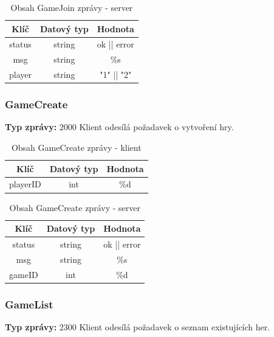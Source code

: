 \documentclass[12pt, a4paper]{article}
\begin{document}
    \begin{table}[H]
        \centering
        \begin{tabular}{|c|c|c|}
            \hline
            Klíč & Datový typ & Hodnota \\
            \hline
            \hline
            status & string & ok || error \\
            \hline
            msg & string & \%s \\
            \hline
            player & string & "1" || "2" \\
            \hline
        \end{tabular}
        \caption{Obsah GameJoin zprávy - server}
    \end{table}

\subsubsection{GameCreate}
\textbf{Typ zprávy: } 2000 \newline
Klient odesílá požadavek o vytvoření hry. \newline

    \begin{table}[H]
        \centering
        \begin{tabular}{|c|c|c|}
            \hline
            Klíč & Datový typ & Hodnota \\
            \hline
            \hline
            playerID & int & \%d \\
            \hline
        \end{tabular}
        \caption{Obsah GameCreate zprávy - klient}
    \end{table}

    \begin{table}[H]
        \centering
        \begin{tabular}{|c|c|c|}
            \hline
            Klíč & Datový typ & Hodnota \\
            \hline
            \hline
            status & string & ok || error \\
            \hline
            msg & string & \%s \\
            \hline
            gameID & int & \%d \\
            \hline
        \end{tabular}
        \caption{Obsah GameCreate zprávy - server}
    \end{table}

\subsubsection{GameList}
\textbf{Typ zprávy: } 2300 \newline
Klient odesílá požadavek o seznam existujících her. \newline
\end{document}
